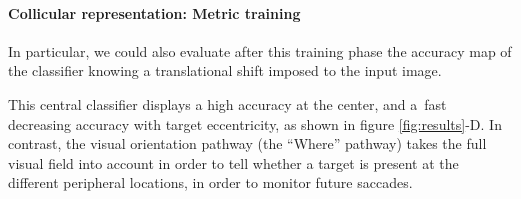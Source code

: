 \paragraph{Collicular representation: Metric training}

 In particular, we could also evaluate after this training phase the accuracy map of the classifier knowing a translational shift imposed to the input image. 






 This central classifier displays a high accuracy at the center, and a fast decreasing accuracy with target eccentricity, as shown in figure \ref{fig:results}-D. In contrast, the visual orientation pathway (the ``Where'' pathway) takes the full visual field into account in order to tell whether a target is present at the different peripheral locations, in order to monitor future saccades.





